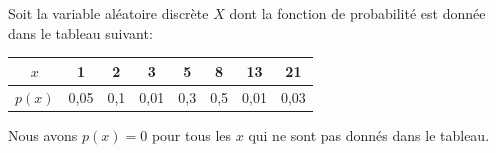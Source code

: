 \begin{questions}


\pageblanche


\question Soit la variable aléatoire discrète $X$ dont la fonction de probabilité est donnée dans le tableau suivant:

\begin{table}[h]
    \centering
        \begingroup
\setlength{\tabcolsep}{10pt}    %
\renewcommand{\arraystretch}{1.5}%
    \begin{tabular}{|c|c|c|c|c|c|c|c|}
    \hline
        $x$ & 1 & 2 & 3 & 5 & 8 & 13 & 21  \\
        \hline
        $p(x)$ & 0,05 & 0,1 & 0,01 & 0,3 & 0,5 & 0,01 &0,03\\
        \hline
    \end{tabular}
    \endgroup
    \end{table}
Nous avons $p(x)=0$ pour tous les $x$ qui ne sont pas donnés dans le tableau.

\end{questions}
